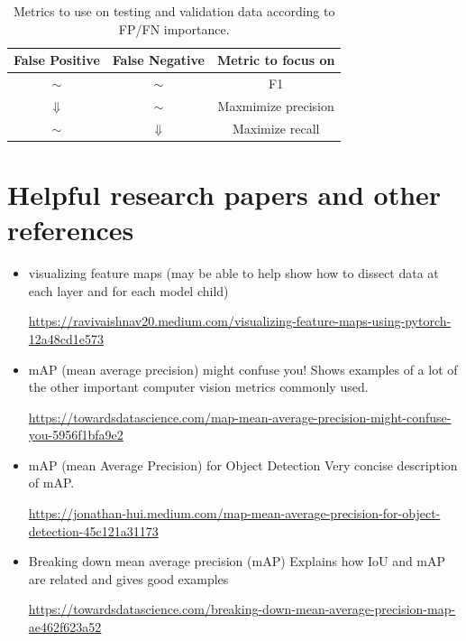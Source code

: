 \documentclass[]{article}
\begin{document}
\begin{table}[!h]
	\begin{center}
		\caption{Metrics to use on testing and validation data according to FP/FN importance.}
		\label{tab:table1}
		\begin{tabular}{|c|c|c|}
			\hline
			False Positive & False Negative & Metric to focus on\\
			\hline
		$\sim$ &$\sim$ & F1\\
			$\Downarrow$ &$\sim$ & Maxmimize precision\\
		$\sim$ &$\Downarrow$ & Maximize recall\\
			\hline
			
			\hline
		\end{tabular}
	\end{center}
\end{table}

\section{Helpful research papers and other references}
\begin{itemize}
\item visualizing feature maps 
(may be able to help show how to dissect data at each layer and for each model child)

\url{https://ravivaishnav20.medium.com/visualizing-feature-maps-using-pytorch-12a48cd1e573}

\item mAP (mean average precision) might confuse you!
Shows examples of a lot of the other important computer vision metrics commonly used.

\url{https://towardsdatascience.com/map-mean-average-precision-might-confuse-you-5956f1bfa9e2}

\item mAP (mean Average Precision) for Object Detection
Very concise description of mAP.

\url{https://jonathan-hui.medium.com/map-mean-average-precision-for-object-detection-45c121a31173}

\item Breaking down mean average precision (mAP)
Explains how IoU and mAP are related and gives good examples

\url{https://towardsdatascience.com/breaking-down-mean-average-precision-map-ae462f623a52}
\end{itemize}
\end{document}

